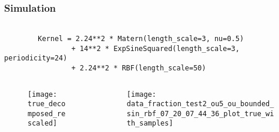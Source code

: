 \documentclass[
	8pt, %
]{beamer}
\begin{document}
\begin{frame}[fragile]
	\frametitle{Simulation}

	\begin{verbatim}

		Kernel = 2.24**2 * Matern(length_scale=3, nu=0.5)
				+ 14**2 * ExpSineSquared(length_scale=3, periodicity=24)
				+ 2.24**2 * RBF(length_scale=50)

	\end{verbatim}

		\begin{columns}[c] %
		\begin{column}{0.45\textwidth} %
				\begin{figure}
					\texttt{[image: true\_decomposed\_rescaled]}
				\end{figure}
		\end{column}
		\begin{column}{0.5\textwidth} %
				\begin{figure}
					\texttt{[image: data\_fraction\_test2\_ou5\_ou\_bounded\_sin\_rbf\_07\_20\_07\_44\_36\_plot\_true\_with\_samples]}
				\end{figure}

		\end{column}
	\end{columns}

\end{frame}
\end{document}
